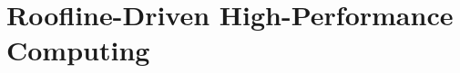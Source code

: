 \documentclass[11pt,openany]{book}
\begin{document}
\part{Roofline-Driven High-Performance Computing}








\appendix

\backmatter

\end{document}
